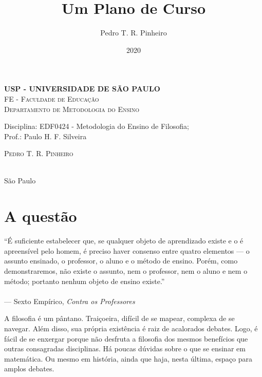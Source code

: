 \documentclass[12pt,a4paper]{article}
\author{Pedro T. R. Pinheiro}
\date{2020}
\title{Um Plano de Curso}
\newenvironment{epigraf}{
	\begin{addmargin}[6cm]{1em} \scriptsize}{\normalfont \end{addmargin}
}
\newcommand{\subtitulo}{}
\newcommand{\disciplina}{EDF0424 - Metodologia do Ensino de Filosofia}
\newcommand{\departamento}{Departamento de Metodologia do Ensino}
\newcommand{\unidade}{FE - Faculdade de Educação}
\newcommand{\prof}{Paulo H. F. Silveira}
\begin{document}
	\begin{center}
				\textbf{
				\LARGE USP - UNIVERSIDADE DE SÃO PAULO \\
			}
			\Large \textsc{\unidade} \\
			\large \textsc{\departamento}\\
			\vspace*{1cm}
				
			Disciplina: \disciplina; \\Prof.: \prof
			\vfill
			\begin{center}
				{\Large \textsc{Pedro T. R. Pinheiro}} \\ 
				\vspace{1cm}
				\LARGE\textbf{\thetitle} \\
				\Large\emph{\subtitulo}
			\end{center}
			\vfill
			\large São Paulo \\
			\large\thedate
			\vspace*{1cm}
			\thispagestyle{empty}
	\end{center}

	\newpage
	
	\setlength{\parskip}{0.5cm}
	\setlength{\parindent}{1.1cm}
	\onehalfspacing	
	
	\section{A questão}
	
	\setlength{\epigraphrule}{0pt}
	\begin{epigraf}
		``É suficiente estabelecer que, se qualquer objeto de 
		aprendizado existe e o é apreensível pelo homem, é 
		preciso haver consenso entre quatro elementos ---
		o assunto ensinado, o professor, o aluno e o 
		método de ensino. Porém, como demonstraremos, não 
		existe o assunto, nem o professor, nem o aluno e 
		nem o método; portanto nenhum objeto de ensino existe.'' \\
		\\--- Sexto Empírico, \textit{Contra os Professores}%
	\end{epigraf}
	
	A filosofia é um pântano. Traiçoeira, difícil de se mapear, complexa 
	de se navegar. Além disso, sua própria existência é raiz de acalorados 
	debates. Logo, é fácil de se enxergar porque não desfruta a filosofia 
	dos mesmos benefícios que outras consagradas disciplinas. Há poucas 
	dúvidas sobre o que se ensinar em matemática. Ou mesmo em história, 
	ainda que haja, nesta última, espaço para amplos debates. 
\end{document}
